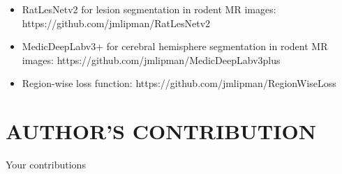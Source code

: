 \begin{itemize}
\item RatLesNetv2 for lesion segmentation in rodent MR images: \\ https://github.com/jmlipman/RatLesNetv2
\item MedicDeepLabv3+ for cerebral hemisphere segmentation in rodent MR images: https://github.com/jmlipman/MedicDeepLabv3plus
\item Region-wise loss function: https://github.com/jmlipman/RegionWiseLoss
\end{itemize}
\vspace{20mm}
%
\section*{AUTHOR'S CONTRIBUTION}
%
%
Your contributions

%
\vfill









